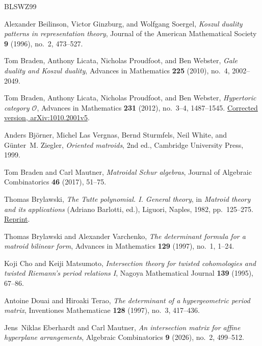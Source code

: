 \begin{thebibliography}{BLSWZ99}

Alexander Beilinson, Victor Ginzburg, and Wolfgang Soergel, \emph{Koszul
  duality patterns in representation theory}, Journal of the American
  Mathematical Society \textbf{9} (1996), no.~2, 473--527.

Tom Braden, Anthony Licata, Nicholas Proudfoot, and Ben Webster, \emph{Gale
  duality and {K}oszul duality}, Advances in Mathematics \textbf{225} (2010),
  no.~4, 2002--2049.

Tom Braden, Anthony Licata, Nicholas Proudfoot, and Ben Webster,
\emph{Hypertoric category \(\mathcal O\)}, Advances in Mathematics
  \textbf{231} (2012), no.~3--4, 1487--1545.
\href{https://arxiv.org/pdf/1010.2001v5}{Corrected version, arXiv:1010.2001v5}.

Anders Bj\"orner, Michel Las Vergnas, Bernd Sturmfels, Neil White, and
G\"unter~M. Ziegler, \emph{Oriented matroids}, 2nd ed., Cambridge
University Press, 1999.

Tom Braden and Carl Mautner, \emph{Matroidal {S}chur algebras},  Journal of Algebraic Combinatorics \textbf{46} (2017), 51--75.


Thomas Brylawski, \emph{The Tutte polynomial. I. General theory},
in \emph{Matroid theory and its applications} (Adriano Barlotti, ed.),
Liguori, Naples, 1982, pp.~125--275.
\href{https://doi.org/10.1007/978-3-642-11110-5_3}{Reprint}.

Thomas Brylawski and Alexander Varchenko, \emph{The determinant formula
for a matroid bilinear form}, Advances in Mathematics \textbf{129}
(1997), no.~1, 1--24.

Koji Cho and Keiji Matsumoto, \emph{Intersection theory for twisted
cohomologies and twisted Riemann's period relations I}, Nagoya
Mathematical Journal \textbf{139} (1995), 67--86.

Antoine Douai and Hiroaki Terao, \emph{The determinant of a hypergeometric
  period matrix}, Inventiones Mathematicae \textbf{128} (1997), no.~3,
  417--436.

Jens~Niklas Eberhardt and Carl Mautner, \emph{An intersection matrix for
  affine hyperplane arrangements}, Algebraic Combinatorics \textbf{9}
  (2026), no.~2, 499--512.


\end{thebibliography}
